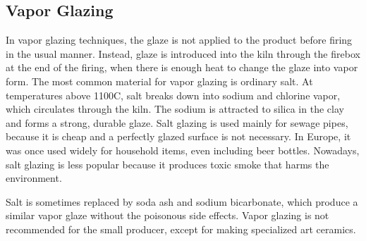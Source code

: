 \subsection{Vapor Glazing}
In vapor glazing techniques, the glaze is not applied to the product before 
firing in the usual manner. Instead, glaze is introduced into the kiln through 
the firebox at the end of the firing, when there is enough heat to change the 
glaze into vapor form. The most common material for vapor glazing is ordinary 
salt. At temperatures above 1100\degree C, salt breaks down into sodium and 
chlorine vapor, which circulates through the kiln. The sodium is attracted to 
silica in the clay and forms a strong, durable glaze. Salt glazing is used 
mainly for sewage pipes, because it is cheap and a perfectly glazed surface is 
not necessary. In Europe, it was once used widely for household items, even 
including beer bottles. Nowadays, salt glazing is less popular because it 
produces toxic smoke that harms the environment.

Salt is sometimes replaced by soda ash and sodium bicarbonate, which produce a 
similar vapor glaze without the poisonous side effects. Vapor glazing is not 
recommended for the small producer, except for making specialized art ceramics.
